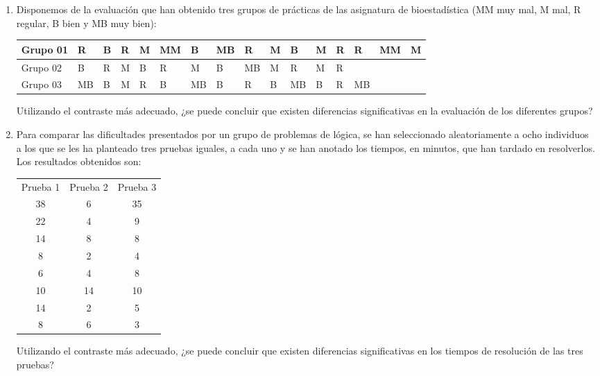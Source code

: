 \begin{enumerate}[leftmargin=*]
\item Disponemos de la evaluación que han obtenido tres grupos de prácticas de las asignatura de bioestadística (MM muy
mal, M mal, R regular, B bien y MB muy bien):
\begin{center}
\begin{tabular}{|l|l|l|l|l|l|l|l|l|l|l|l|l|l|l|l|}
\hline
Grupo 01 & R & B & R & M & MM & B & MB & R & M & B & M & R & R & MM & M\\
\hline
Grupo 02 & B & R & M & B & R & M & B & MB & M & R & M & R & & &  \\
\hline
Grupo 03 & MB & B & M & R & B & MB & B & R & B & MB & B & R & MB & &  \\
\hline
\end{tabular}
\end{center}

Utilizando el contraste más adecuado, ¿se puede concluir que existen diferencias significativas en la evaluación de los
diferentes grupos?


\item Para comparar las dificultades presentados por un grupo de problemas de lógica, se han seleccionado aleatoriamente
a ocho individuos a los que se les ha planteado tres pruebas iguales, a cada uno y se han anotado los tiempos, en
minutos, que han tardado en resolverlos. 
Los resultados obtenidos son:
\begin{center}
\begin{tabular}{ccc}
\hline
Prueba 1 & Prueba 2 & Prueba 3 \\
38 & 6 & 35 \\
22 & 4 & 9 \\
14 & 8 & 8 \\
8 & 2 & 4 \\
6 & 4 & 8 \\
10 & 14 & 10 \\
14 & 2 & 5 \\
8 & 6 & 3 \\
\hline
\end{tabular}
\end{center}

Utilizando el contraste más adecuado, ¿se puede concluir que existen diferencias significativas en los tiempos de
resolución de las tres pruebas?



\end{enumerate}
